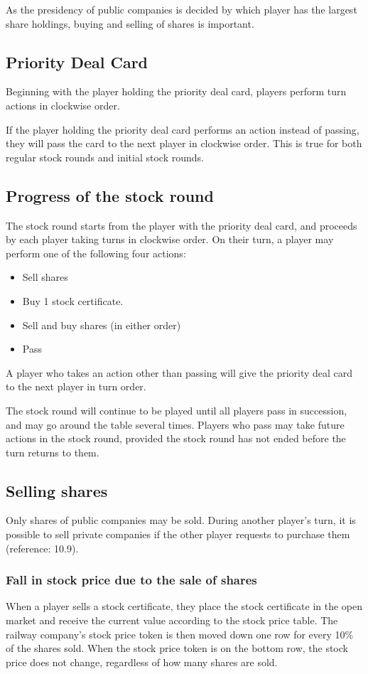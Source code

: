 \documentclass{article}
\begin{document}
\begin{CJK}{UTF8}{min}
As the presidency of public companies is decided by which player has
the largest share holdings, buying and selling of shares is important.

\subsection{Priority Deal Card}
Beginning with the player holding the priority deal card, players
perform turn actions in clockwise order.

If the player holding the priority deal card performs an action
instead of passing, they will pass the card to the next player in
clockwise order. This is true for both regular stock rounds and
initial stock rounds.

\subsection{Progress of the stock round}
The stock round starts from the player with the priority deal card,
and proceeds by each player taking turns in clockwise order. On their
turn, a player may perform one of the following four actions:
\begin{itemize}
\item Sell shares
\item Buy 1 stock certificate.
\item Sell and buy shares (in either order)
\item Pass
\end{itemize}

A player who takes an action other than passing will give the priority
deal card to the next player in turn order.

The stock round will continue to be played until all players pass in
succession, and may go around the table several times. Players who
pass may take future actions in the stock round, provided the stock
round has not ended before the turn returns to them.

\subsection{Selling shares}
Only shares of public companies may be sold. During another player's
turn, it is possible to sell private companies if the other player
requests to purchase them (reference: 10.9).

\subsubsection{Fall in stock price due to the sale of shares}
When a player sells a stock certificate, they place the stock
certificate in the open market and receive the current value according
to the stock price table. The railway company's stock price token is then moved
down one row for every 10\% of the shares sold. When the stock price token
is on the bottom row, the stock price does not change, regardless of
how many shares are sold.


\end{CJK}
\end{document}
